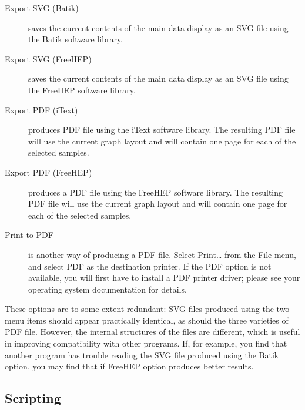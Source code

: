 \documentclass[a4paper,british]{article}
\newcommand{\ppcmd}[1]{\textsf{#1}} %
\newcommand{\caps}[1]{\MakeTextUppercase{#1}} %
\begin{document}
\begin{description}

\item[Export SVG (Batik)] saves the current contents of the main
  data display as an \caps{svg} file using the Batik software
  library.

\item[Export SVG (FreeHEP)] saves the current contents of the main
  data display as an \caps{svg} file using the FreeHEP software
  library.

\item[Export PDF (iText)] produces \caps{pdf} file using the iText software
  library. The resulting \caps{pdf} file will use the current graph layout
  and will contain one page for each of the selected samples.

\item[Export PDF (FreeHEP)] produces a \caps{pdf} file using the FreeHEP
  software library. The resulting \caps{pdf} file will use the current graph
  layout and will contain one page for each of the selected samples.

\item[Print to PDF] is another way of producing a PDF file. Select
  \ppcmd{Print\ldots} from the \ppcmd{File} menu, and select \ppcmd{PDF} as
  the destination printer. If the PDF option is not available, you will
  first have to install a PDF printer driver; please see your operating
  system documentation for details.

\end{description}

These options are to some extent redundant: SVG files produced using the two
menu items should appear practically identical, as should the three varieties
of PDF file. However, the internal structures of the files are different,
which is useful in improving compatibility with other programs. If, for
example, you find that another program has trouble reading the SVG file
produced using the Batik option, you may find that if FreeHEP option 
produces better results.

\subsection{\label{sec:scripting}Scripting}
\end{document}

